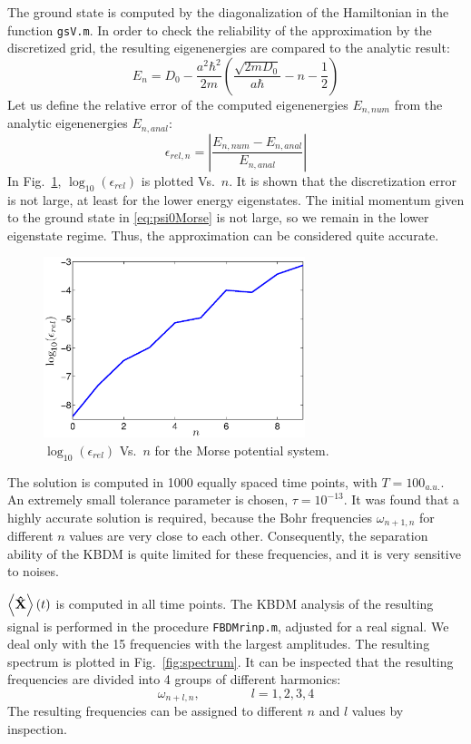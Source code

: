 \documentclass[12pt, a4paper]{article}
\begin{document}
The ground state is computed by the diagonalization of the Hamiltonian in the function \texttt{gsV.m}. In order to check the reliability of the approximation by the discretized grid, the resulting eigenenergies are compared to the analytic result:
\begin{equation}\label{eq:Emorse}
	E_n = D_0 - \frac{a^2\hbar^2}{2m}\left(\frac{\sqrt{2mD_0}}{a\hbar} - n - \frac{1}{2} \right)
\end{equation}
Let us define the relative error of the computed eigenenergies $E_{n,num}$ from the analytic eigenenergies $E_{n,anal}$:
\begin{equation}
	\epsilon_{rel,n} = \left| \frac{E_{n,num}-E_{n,anal}}{E_{n,anal}}\right|
\end{equation}
In Fig.~\ref{fig:epsMorse}, $\log_{10}(\epsilon_{rel})$ is plotted Vs.\ $n$. It is shown that the discretization error is not large, at least for the lower energy eigenstates. The initial momentum given to the ground state in \eqref{eq:psi0Morse} is not large, so we remain in the lower eigenstate regime. Thus, the approximation can be considered quite accurate.

\begin{figure}[htb]
	\centering\includegraphics[width=3in]{morseEerror}
	\caption{$\log_{10}(\epsilon_{rel})$ Vs.\ $n$ for the Morse potential system.}\label{fig:epsMorse}
\end{figure}

The solution is computed in 1000 equally spaced time points, with $T=100_{a.u.}$. An extremely small tolerance parameter is chosen, $\tau = 10^{-13}$. It was found that a highly accurate solution is required, because the Bohr frequencies $\omega_{n+1,n}$ for different $n$ values are very close to each other. Consequently, the separation ability of the KBDM is quite limited for these frequencies, and it is very sensitive to noises.

$\left<\mathbf{\hat X} \right>(t)$ is computed in all time points. The KBDM analysis of the resulting signal is performed in the procedure \texttt{FBDMrinp.m}, adjusted for a real signal. We deal only with the 15 frequencies with the largest amplitudes. The resulting spectrum is plotted in Fig.~\ref{fig:spectrum}. It can be inspected that the resulting frequencies are divided into 4 groups of different harmonics:
\begin{equation}\label{eq:wl}
	\omega_{n+l,n}, \qquad\qquad l=1,2,3,4
\end{equation}
The resulting frequencies can be assigned to different $n$ and $l$ values by inspection.
\end{document}
